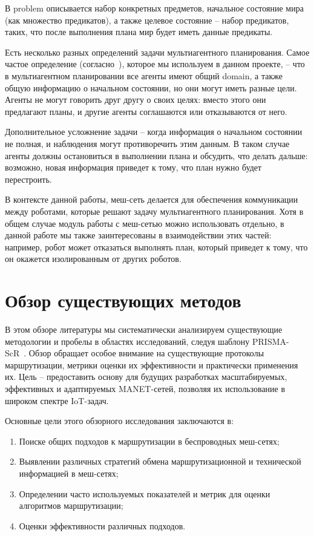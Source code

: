 \documentclass[%
]{report}
\begin{document}
В problem описывается набор конкретных предметов,
начальное состояние мира (как множество предикатов),
а также целевое состояние -- набор предикатов, таких, что
после выполнения плана мир будет иметь данные предикаты.

Есть несколько разных определений задачи мультиагентного планирования.
Самое частое определение (согласно~\cite{doi:10.3233/MGS-2009-0133}),
которое мы используем в данном проекте, --
что в мультиагентном планировании
все агенты имеют общий domain,
а также общую информацию о начальном состоянии,
но они могут иметь разные цели.
Агенты не могут говорить друг другу о своих целях:
вместо этого они предлагают планы,
и другие агенты соглашаются или отказываются от него.

Дополнительное усложнение задачи --
когда информация о начальном состоянии не полная,
и наблюдения могут противоречить этим данным.
В таком случае агенты должны остановиться в выполнении плана
и обсудить, что делать дальше:
возможно, новая информация приведет к тому, что план нужно будет перестроить.

В контексте данной работы, меш-сеть делается для обеспечения коммуникации между роботами,
которые решают задачу мультиагентного планирования.
Хотя в общем случае модуль работы с меш-сетью можно использовать отдельно,
в данной работе мы также заинтересованы в взаимодействии этих частей:
например, робот может отказаться выполнять план,
который приведет к тому, что он окажется изолированным от других роботов.


\chapter{Обзор существующих методов}

В этом обзоре литературы мы
систематически анализируем существующие методологии
и пробелы в областях исследований,
следуя шаблону PRISMA-ScR~\cite{prisma-src}.
Обзор обращает особое внимание на
существующие протоколы маршрутизации,
метрики оценки их эффективности и практически применения их.
Цель -- предоставить основу для будущих разработках
масштабируемых, эффективных и адаптируемых
MANET-сетей,
позволяя их использование в широком спектре IoT-задач.

Основные цели этого обзорного исследования заключаются в:

\begin{enumerate}

\item Поиске общих подходов к маршрутизации в беспроводных меш-сетях;
\item Выявлении различных стратегий обмена маршрутизационной и технической информацией в меш-сетях;
\item Определении часто используемых показателей и метрик для оценки алгоритмов маршрутизации;
\item Оценки эффективности различных подходов.
\end{enumerate}
\end{document}
